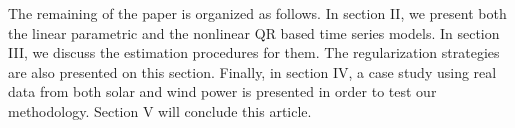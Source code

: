 
The remaining of the paper is organized as follows. In section II, we present both the linear parametric and the nonlinear QR based time series models. In section III, we discuss the estimation procedures for them. The regularization strategies are also presented on this section. Finally, in section IV, a case study using real data from both solar and wind power is presented in order to test our methodology. Section V will conclude this article.





% 
%
%	
%


















%
%
%
%
%
%
%
%
%





